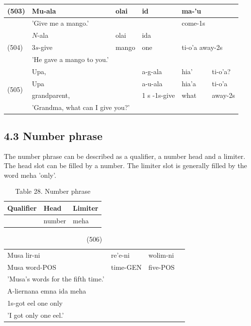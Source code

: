\documentclass[10pt]{article}
\begin{document}
\begin{center}
\begin{tabular}{|l|l|l|l|l|l|}
\hline
\multirow[t]{2}{*}{(503)} & Mu-ala & olai & id & ma-'u & \multirow{2}{*}{} \\
\hline
 & \multicolumn{3}{|l|}{'Give me a mango.'} & come-1s &  \\
\hline
\multirow[t]{3}{*}{(504)} & \(N\)-ala & olai & ida & \multicolumn{2}{|l|}{\multirow[t]{3}{*}{ti-o'a away-2s}} \\
\hline
 & \(3 s\)-give & mango & one &  &  \\
\hline
 & 'He gave a mango to you.' &  &  &  &  \\
\hline
\multirow[t]{4}{*}{(505)} & Upa, &  & a-g-ala & hia' & ti-o'a? \\
\hline
 & Upa &  & a-u-ala & hia'a & ti-o'a \\
\hline
 & grandparent, &  & 1 s -1s-give & what & away-2s \\
\hline
 & \multicolumn{5}{|l|}{'Grandma, what can I give you?'} \\
\hline
\end{tabular}
\end{center}

\subsection*{4.3 Number phrase}
The number phrase can be described as a qualifier, a number head and a limiter. The head slot can be filled by a number. The limiter slot is generally filled by the word meha 'only'.

\begin{table}[h]
\begin{center}
\captionsetup{labelformat=empty}
\caption{Table 28. Number phrase}
\begin{tabular}{|l|l|l|}
\hline
Qualifier & Head & Limiter \\
\hline
 & number & meha \\
\hline
\end{tabular}
\end{center}
\end{table}

\begin{table}[h]
\begin{center}
\captionsetup{labelformat=empty}
\caption{(506)}
\begin{tabular}{llll}
Musa lir-ni & re'e-ni & wolim-ni \\
Musa word-POS & time-GEN & five-POS \\
'Musa's words for the fifth time.' &  &  \\
A-liernana emna ida meha &  &  \\
1s-got eel one only &  &  \\
'I got only one eel.' &  &  \\
\end{tabular}
\end{center}
\end{table}
\end{document}

